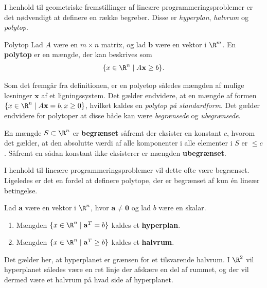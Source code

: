 I henhold til geometriske fremstillinger af lineære programmeringsproblemer er det nødvendigt at definere en række begreber.
Disse er \textit{hyperplan}, \textit{halvrum} og \textit{polytop}.
%
\begin{defn}{}{Polytop}
Lad $A$ være en $m \times n$ matrix, og lad $\mathbf{b}$ være en vektor i  $\R^m$.
En \textbf{polytop} er en mængde, der kan beskrives som 
\begin{align*}
\{x\in \R^n \mid A\mathbf{x}\geq b\}.
\end{align*}
%
\end{defn}
\noindent
%
Som det fremgår fra definitionen, er en polyetop således mængden af mulige løsninger $\mathbf{x}$ af et ligningssystem.
Det gælder endvidere, at en mængde af formen $ \{x \in \R^n \mid A\textbf{x}=b,x \geq 0 \}$, hvilket kaldes en \textit{polytop på standardform}. 
%
Det gælder endvidere for polytoper at disse både kan være \textit{begrænsede} og \textit{ubegrænsede}.
%
\begin{defn}{}{}
En mængde $S \subset \R^n$ er \textbf{begrænset} såfremt der eksister en konstant $c$, hvorom det gælder, at den absolutte værdi af alle komponenter i alle elementer i $S$ er $\leq c$. 
Såfremt en sådan konstant ikke eksisterer er mængden \textbf{ubegrænset}. 
\end{defn}
\noindent
%
%
I henhold til lineære programmeringsproblemer vil dette ofte være begrænset.
Ligeledes er det en fordel at definere polytope, der er begrænset af kun én lineær betingelse. 
%
%
\begin{defn}{}{}
Lad $\mathbf{a}$ være en vektor i $\R^n$, hvor $\mathbf{a} \neq \mathbf{0}$ og lad $b$ være en skalar.
\begin{enumerate}[label=(\alph*)]
\item Mængden $\{x \in \R^n \mid \mathbf{a}^T=b\}$ kaldes et \textbf{hyperplan}.
\item Mængden $\{x \in \R^n \mid \mathbf{a}^T \geq b\}$ kaldes et \textbf{halvrum}.
\end{enumerate}
\end{defn}
\noindent
%
Det gælder her, at hyperplanet er grænsen for et tilsvarende halvrum.
I $\R^2$ vil hyperplanet således være en ret linje der afskære en del af rummet, og der vil dermed være et halvrum på hvad side af hyperplanet.

